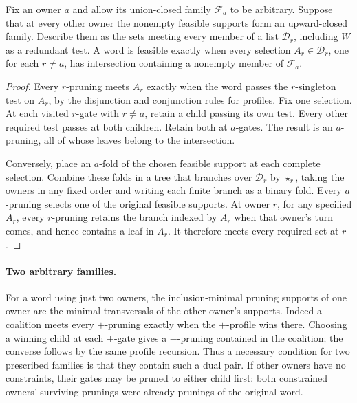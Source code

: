 \begin{corollary}
\label{core:cor:one-arbitrary-pruning-family}
Fix an owner $a$ and allow its union-closed family $\mathcal F_a$ to
be arbitrary. Suppose that at every other owner the nonempty feasible
supports form an upward-closed family. Describe them as the sets
meeting every member of a list $\mathcal D_r$, including $W$ as a
redundant test. A word is feasible exactly when every selection
$A_r\in\mathcal D_r$, one for each $r\ne a$, has intersection
containing a nonempty member of $\mathcal F_a$.
\end{corollary}
\begin{proof}
Every $r$-pruning meets $A_r$ exactly when the word passes the
$r$-singleton test on $A_r$, by the disjunction and conjunction rules
for profiles. Fix one selection. At each visited $r$-gate with
$r\ne a$, retain a child passing its own test. Every other required
test passes at both children. Retain both at $a$-gates. The result
is an $a$-pruning, all of whose leaves belong to the intersection.

Conversely, place an $a$-fold of the chosen feasible support at each
complete selection. Combine these folds in a tree that branches over
$\mathcal D_r$ by $\star_r$, taking the owners in any fixed order
and writing each finite branch as a binary fold. Every $a$-pruning
selects one of the original feasible supports. At owner $r$, for any
specified $A_r$, every $r$-pruning retains the branch indexed by
$A_r$ when that owner's turn comes, and hence contains a leaf in
$A_r$. It therefore meets every required set at $r$.
\end{proof}

\paragraph{Two arbitrary families.}
For a word using just two owners, the inclusion-minimal pruning supports
of one owner are the minimal transversals of the other owner's supports.
Indeed a coalition meets every $+$-pruning exactly when the $+$-profile
wins there. Choosing a winning child at each $+$-gate gives a
$-$-pruning contained in the coalition; the converse follows by the
same profile recursion. Thus a necessary condition for two prescribed
families is that they contain such a dual pair. If other owners have
no constraints, their gates may be pruned to either child first:
both constrained owners' surviving prunings were already prunings of
the original word.

